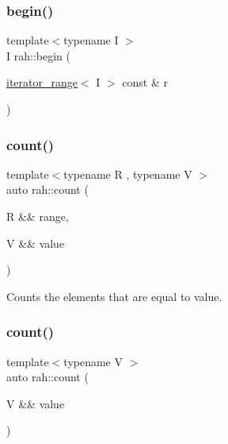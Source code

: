 \mbox{\label{namespacerah_a14e69321e6772651b349cb31467ea3a2}} 
\subsubsection{\texorpdfstring{begin()}{begin()}\hspace{0.1cm}{\footnotesize\ttfamily [2/2]}}
{\footnotesize\ttfamily template$<$typename I $>$ \\
I rah\+::begin (\begin{DoxyParamCaption}\item[{\mbox{\hyperlink{structrah_1_1iterator__range}{iterator\+\_\+range}}$<$ I $>$ const \&}]{r }\end{DoxyParamCaption})}

\mbox{\label{namespacerah_aa528865cc4a45d4eb276329554f16b4b}} 
\subsubsection{\texorpdfstring{count()}{count()}\hspace{0.1cm}{\footnotesize\ttfamily [1/2]}}
{\footnotesize\ttfamily template$<$typename R , typename V $>$ \\
auto rah\+::count (\begin{DoxyParamCaption}\item[{R \&\&}]{range,  }\item[{V \&\&}]{value }\end{DoxyParamCaption})}



Counts the elements that are equal to value. 


\begin{DoxyCodeInclude}{0}
\end{DoxyCodeInclude}
\mbox{\label{namespacerah_ae8400202fc4005dbade0f479dd556ec3}} 
\subsubsection{\texorpdfstring{count()}{count()}\hspace{0.1cm}{\footnotesize\ttfamily [2/2]}}
{\footnotesize\ttfamily template$<$typename V $>$ \\
auto rah\+::count (\begin{DoxyParamCaption}\item[{V \&\&}]{value }\end{DoxyParamCaption})}



